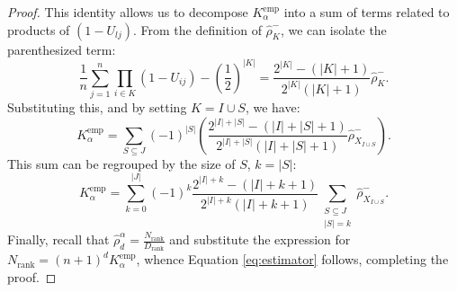 \documentclass[10pt,a4paper]{amsart}
\begin{document}
\begin{proof}
This identity allows us to decompose $K_{\alpha}^{\text{emp}}$ into a sum of terms related to products of $(1-U_{lj})$.
From the definition of $\widehat{\rho}_K^-$, we can isolate the parenthesized term:
$$ \frac{1}{n} \sum_{j=1}^n \prod_{i \in K} (1 - U_{ij}) - \left(\frac{1}{2}\right)^{|K|} = \frac{2^{|K|}-(|K|+1)}{2^{|K|}(|K|+1)} \widehat{\rho}_K^-. $$
Substituting this, and by setting $K = I \cup S$, we have:
$$K_{\alpha}^{\text{emp}} = \sum_{S \subseteq J} (-1)^{|S|} \left( \frac{2^{|I|+|S|}-(|I|+|S|+1)}{2^{|I|+|S|}(|I|+|S|+1)} \widehat{\rho}_{X_{I\cup S}}^- \right).$$
This sum can be regrouped by the size of $S$, $k=|S|$:
$$K_{\alpha}^{\text{emp}} = \sum_{k=0}^{|J|} (-1)^k \frac{2^{|I|+k}-(|I|+k+1)}{2^{|I|+k}(|I|+k+1)} \sum_{\substack{S \subseteq J \\ |S|=k}} \widehat{\rho}_{X_{I\cup S}}^-.$$
Finally, recall that $\widehat{\rho}_d^{\alpha} = \frac{N_{\text{rank}}}{D_{\text{rank}}}$ and substitute the expression for $N_{\text{rank}} = (n+1)^d K_{\alpha}^{\text{emp}}$, whence Equation \eqref{eq:estimator} follows, completing the proof.
\end{proof}
\end{document}
